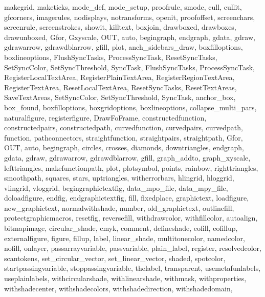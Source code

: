 {{        makegrid, maketicks, mode_def, mode_setup, proofrule, smode,%
        cull, cullit, gfcorners, imagerules, nodisplays,%
        notransforms, openit, proofoffset, screenchars,%
        screenrule, screenstrokes, showit, killtext,%
        boxjoin, drawboxed, drawboxes, drawunboxed,%
        Gfor, Gxyscale, OUT, auto, begingraph, endgraph, gdata,%
        gdraw, gdrawarrow, gdrawdblarrow, gfill, plot,%
        anch_sidebars_draw, boxfilloptions, boxlineoptions,%
        FlushSyncTasks, ProcessSyncTask, ResetSyncTasks,%
        SetSyncColor, SetSyncThreshold, SyncTask,%
        FlushSyncTasks, ProcessSyncTask,%
        RegisterLocalTextArea, RegisterPlainTextArea,%
        RegisterRegionTextArea, RegisterTextArea,%
        ResetLocalTextArea, ResetSyncTasks, ResetTextAreas,%
        SaveTextAreas, SetSyncColor, SetSyncThreshold,%
        SyncTask, anchor_box, box_found, boxfilloptions,%
        boxgridoptions, boxlineoptions, collapse_multi_pars,%
        naturalfigure, registerfigure, DrawFoFrame,%
        constructedfunction, constructedpairs,%
        constructedpath, curvedfunction, curvedpairs,%
        curvedpath, function, pathconnectors, straightfunction,%
        straightpairs, straightpath,%
        Gfor, OUT, auto, begingraph, circles, crosses, diamonds,%
        downtriangles, endgraph, gdata, gdraw, gdrawarrow,%
        gdrawdblarrow, gfill, graph_addto,%
        graph_xyscale, lefttriangles, makefunctionpath, plot,%
        plotsymbol, points, rainbow, righttriangles, smoothpath,%
        squares, stars, uptriangles, witherrorbars,%
        hlingrid, hloggrid, vlingrid, vloggrid,%
        begingraphictextfig, data_mpo_file,%
        data_mpy_file, doloadfigure, endfig,%
        endgraphictextfig, fill, fixedplace, graphictext,%
        loadfigure, new_graphictext, normalwithshade, number,%
        old_graphictext, outlinefill, protectgraphicmacros,%
        resetfig, reversefill, withdrawcolor, withfillcolor,%
        autoalign, bitmapimage, circular_shade, cmyk, comment,%
        defineshade, eofill, eofillup, externalfigure, figure,%
        fillup, label, linear_shade, multitonecolor, namedcolor,%
        nofill, onlayer, passarrayvariable, passvariable,%
        plain_label, register, resolvedcolor, scantokens,%
        set_circular_vector, set_linear_vector, shaded,%
        spotcolor, startpassingvariable, stoppassingvariable,%
        thelabel, transparent, usemetafunlabels,%
        useplainlabels, withcircularshade, withlinearshade,%
        withmask, withproperties, withshadecenter,%
        withshadecolors, withshadedirection, withshadedomain,%
}}
